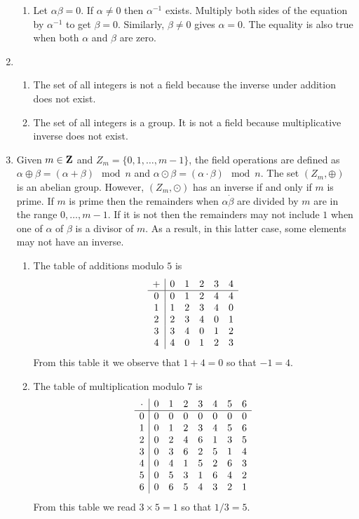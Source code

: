 \begin{enumerate}
\begin{enumerate}
\item Let $\alpha\beta = 0$. If $\alpha \ne 0$ then $\alpha^{-1}$
exists. Multiply both sides of the equation by $\alpha^{-1}$ to get
$\beta = 0$. Similarly, $\beta \ne 0$ gives $\alpha = 0$. The equality
is also true when both $\alpha$ and $\beta$ are zero.
\end{enumerate}

\item
\begin{enumerate}
\item The set of all integers is not a field because the inverse
under addition does not exist.
\item The set of all integers is a group. It is not a field because
multiplicative inverse does not exist.
\end{enumerate}

\item Given $m \in \mathbf{Z}$ and $Z_m = \{0, 1, \ldots, m - 1\}$, the 
field operations are defined as $\alpha \oplus \beta = (\alpha + 
\beta)\mod n$ and $\alpha \odot \beta = (\alpha\cdot\beta)\mod n$.
The set $(Z_m, \oplus)$ is an abelian group. However, $(Z_m, \odot)$
has an inverse if and only if $m$ is prime. If $m$ is prime then the 
remainders when $\alpha\dot\beta$ are divided by $m$ are in the range
$0, \ldots, m- 1$. If it is not then the remainders may not include $1$
when one of $\alpha$ of $\beta$ is a divisor of $m$. As a result, in
this latter case, some elements may not have an inverse.
\begin{enumerate}
\item The table of additions modulo $5$ is
\[
\begin{array}{c|c c c c c}
+ & 0 & 1 & 2 & 3 & 4 \\
\hline 
0 & 0 & 1 & 2 & 4 & 4 \\
1 & 1 & 2 & 3 & 4 & 0 \\
2 & 2 & 3 & 4 & 0 & 1 \\
3 & 3 & 4 & 0 & 1 & 2 \\
4 & 4 & 0 & 1 & 2 & 3
\end{array}
\]
From this table it we observe that $1 + 4 = 0$ so that $-1 = 4$.
\item The table of multiplication modulo $7$ is
\[
\begin{array}{c|c c c c c c c c}
\cdot & 0 & 1 & 2 & 3 & 4 & 5 & 6 \\
\hline
0 & 0 & 0 & 0 & 0 & 0 & 0 & 0 \\
1 & 0 & 1 & 2 & 3 & 4 & 5 & 6 \\
2 & 0 & 2 & 4 & 6 & 1 & 3 & 5 \\
3 & 0 & 3 & 6 & 2 & 5 & 1 & 4 \\
4 & 0 & 4 & 1 & 5 & 2 & 6 & 3 \\
5 & 0 & 5 & 3 & 1 & 6 & 4 & 2 \\
6 & 0 & 6 & 5 & 4 & 3 & 2 & 1 
\end{array}
\]
From this table we read $3 \times 5 = 1$ so that $1/3 = 5$.
\end{enumerate}


\end{enumerate}
